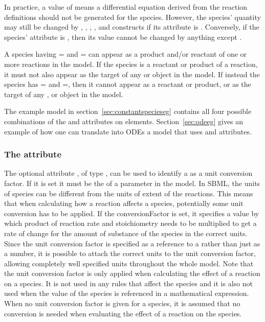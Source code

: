 In practice, a  value of  means
a differential equation derived from the reaction definitions
should not be generated for the species.  However, the species'
quantity may still be changed by \AssignmentRule, \RateRule,
\AlgebraicRule, \Event, and \InitialAssignment constructs if its
 attribute is .  Conversely, if the
species'  attribute is , then its value
cannot be changed by anything except \InitialAssignment.

A species having = and
= can appear as a product and/or
reactant of one or more reactions in the model.  If the species is
a reactant or product of a reaction, it must not also appear as
the target of any \AssignmentRule or \RateRule object in the
model.  If instead the species \color{black} has
= and
=, then it cannot appear as a reactant
or product, or as the target of any \AssignmentRule, \RateRule or
\EventAssignment object in the model.

The example model in section~\ref{sec:constantspecieseg} contains
all four possible combinations of the 
and  attributes on  elements.
Section~\ref{sec:odeeg} gives an example of how one can translate
into ODEs a model that uses  and
 attributes.

\subsubsection{The  attribute}
\label{sec:species-conversion}
The optional attribute , of type
, can be used to identify a \Parameter as a 
unit conversion factor. If it is set it must be the  
of a parameter in the model. 
In SBML, the units of species can be different from the units of extent 
of the reactions. This means that when calculating how a reaction affects
a species, potentially some unit conversion has to be applied. 
If the conversionFactor is set, it specifies a value by which product of
reaction rate and stoichiometry needs to be multiplied to get a rate of change 
for the amount of substance of the species in the correct units. 
Since the unit conversion factor is specified as a reference to a \Parameter 
rather than just as a number, it is possible to attach the correct units
to the unit conversion factor, allowing completely well specified units
throughout the whole model. 
Note that the unit conversion factor is only applied when calculating the 
effect of a reaction on a species. It is not used in any rules that 
affect the species and it is also not used when the value of the species is
referenced in a mathematical expression.
When no unit conversion factor is given for a species, it is assumed 
that no conversion is needed when evaluating the effect of a reaction on 
the species.


